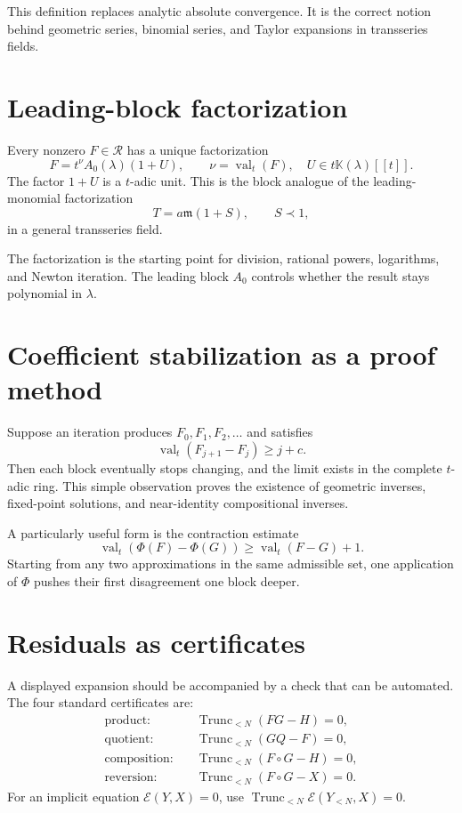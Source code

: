 \documentclass[11pt,openany]{book}
\theoremstyle{definition}
\theoremstyle{plain}
\theoremstyle{remark}
\newcommand{\K}{\mathbb{K}}
\newcommand{\Rlog}{\mathscr{R}}
\newcommand{\m}{\mathfrak{m}}
\newcommand{\precdom}{\prec}
\DeclareMathOperator{\val}{val}
\DeclareMathOperator{\trunc}{Trunc}
\begin{document}
This definition replaces analytic absolute convergence. It is the correct notion behind geometric series, binomial series, and Taylor expansions in transseries fields.

\section{Leading-block factorization}
Every nonzero \(F\in\Rlog\) has a unique factorization
\begin{equation}\label{eq:leading-block-factor}
 F=t^\nu A_0(\lambda)(1+U),
 \qquad \nu=\val_t(F),\quad U\in t\K(\lambda)[[t]].
\end{equation}
The factor \(1+U\) is a \(t\)-adic unit. This is the block analogue of the leading-monomial factorization
\[
 T=a\m(1+S),\qquad S\precdom1,
\]
in a general transseries field.

The factorization is the starting point for division, rational powers, logarithms, and Newton iteration. The leading block \(A_0\) controls whether the result stays polynomial in \(\lambda\).

\section{Coefficient stabilization as a proof method}
Suppose an iteration produces \(F_0,F_1,F_2,\ldots\) and satisfies
\begin{equation}\label{eq:gain-one}
 \val_t(F_{j+1}-F_j)\ge j+c.
\end{equation}
Then each block eventually stops changing, and the limit exists in the complete \(t\)-adic ring. This simple observation proves the existence of geometric inverses, fixed-point solutions, and near-identity compositional inverses.

A particularly useful form is the contraction estimate
\begin{equation}\label{eq:valuation-contraction}
 \val_t(\Phi(F)-\Phi(G))\ge \val_t(F-G)+1.
\end{equation}
Starting from any two approximations in the same admissible set, one application of \(\Phi\) pushes their first disagreement one block deeper.

\section{Residuals as certificates}
A displayed expansion should be accompanied by a check that can be automated. The four standard certificates are:
\begin{align*}
\text{product:}&\quad \trunc_{<N}(FG-H)=0,\\
\text{quotient:}&\quad \trunc_{<N}(GQ-F)=0,\\
\text{composition:}&\quad \trunc_{<N}(F\circ G-H)=0,\\
\text{reversion:}&\quad \trunc_{<N}(F\circ G-X)=0.
\end{align*}
For an implicit equation \(\mathcal E(Y,X)=0\), use \(\trunc_{<N}\mathcal E(Y_{<N},X)=0\).
\end{document}
